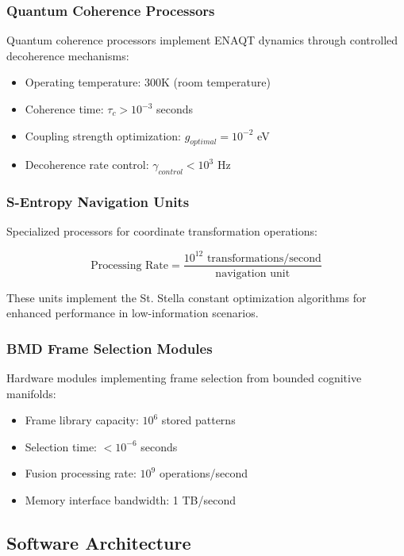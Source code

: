\documentclass[12pt,a4paper]{article}
\theoremstyle{remark}
\begin{document}
\subsubsection{Quantum Coherence Processors}

Quantum coherence processors implement ENAQT dynamics through controlled decoherence mechanisms:

\begin{itemize}
\item Operating temperature: 300K (room temperature)
\item Coherence time: $\tau_c > 10^{-3}$ seconds
\item Coupling strength optimization: $g_{optimal} = 10^{-2}$ eV
\item Decoherence rate control: $\gamma_{control} < 10^3$ Hz
\end{itemize}

\subsubsection{S-Entropy Navigation Units}

Specialized processors for coordinate transformation operations:

\begin{equation}
\text{Processing Rate} = \frac{10^{12} \text{ transformations/second}}{\text{navigation unit}}
\end{equation}

These units implement the St. Stella constant optimization algorithms for enhanced performance in low-information scenarios.

\subsubsection{BMD Frame Selection Modules}

Hardware modules implementing frame selection from bounded cognitive manifolds:

\begin{itemize}
\item Frame library capacity: $10^6$ stored patterns
\item Selection time: $< 10^{-6}$ seconds
\item Fusion processing rate: $10^9$ operations/second
\item Memory interface bandwidth: 1 TB/second
\end{itemize}

\subsection{Software Architecture}
\end{document}
